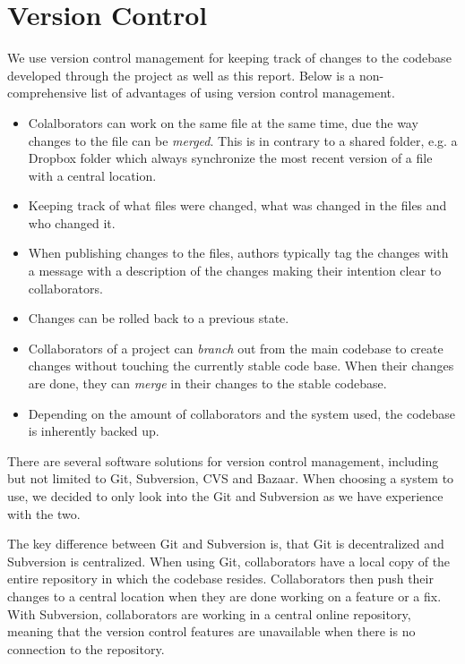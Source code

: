 \section{Version Control}
\label{sec:implementation:version-control}

We use version control management for keeping track of changes to the codebase developed through the project as well as this report. Below is a non-comprehensive list of advantages of using version control management.

\begin{itemize}
\item Colalborators can work on the same file at the same time, due the way changes to the file can be \emph{merged}. This is in contrary to a shared folder, e.g. a Dropbox folder which always synchronize the most recent version of a file with a central location.
\item Keeping track of what files were changed, what was changed in the files and who changed it.
\item When publishing changes to the files, authors typically tag the changes with a message with a description of the changes making their intention clear to collaborators.
\item Changes can be rolled back to a previous state.
\item Collaborators of a project can \emph{branch} out from the main codebase to create changes without touching the currently stable code base. When their changes are done, they can \emph{merge} in their changes to the stable codebase.
\item Depending on the amount of collaborators and the system used, the codebase is inherently backed up.
\end{itemize}

There are several software solutions for version control management, including but not limited to Git, Subversion, CVS and Bazaar. When choosing a system to use, we decided to only look into the Git and Subversion as we have experience with the two.

The key difference between Git and Subversion is, that Git is decentralized and Subversion is centralized. When using Git, collaborators have a local copy of the entire repository in which the codebase resides. Collaborators then push their changes to a central location when they are done working on a feature or a fix. With Subversion, collaborators are working in a central online repository, meaning that the version control features are unavailable when there is no connection to the repository.

